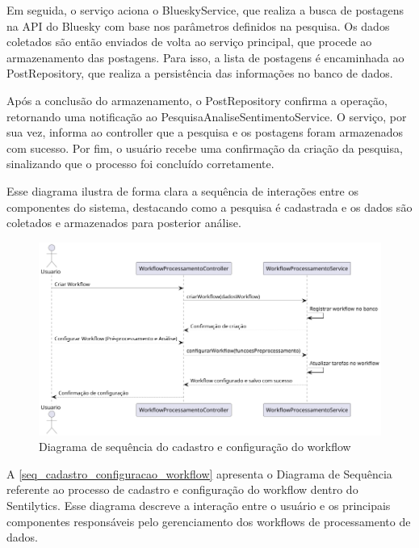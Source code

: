 \documentclass[
	12pt,				%
	oneside,			%
	a4paper,			%
	english,			%
	french,				%
	spanish,			%
	brazil				%
	]{abntex2}
\begin{document}
Em seguida, o serviço aciona o BlueskyService, que realiza a busca de
postagens na API do Bluesky com base nos parâmetros definidos na
pesquisa. Os dados coletados são então enviados de volta ao serviço
principal, que procede ao armazenamento das postagens. Para isso, a
lista de postagens é encaminhada ao PostRepository, que realiza a
persistência das informações no banco de dados.

Após a conclusão do armazenamento, o PostRepository confirma a operação,
retornando uma notificação ao PesquisaAnaliseSentimentoService. O
serviço, por sua vez, informa ao controller que a pesquisa e os
postagens foram armazenados com sucesso. Por fim, o usuário recebe uma
confirmação da criação da pesquisa, sinalizando que o processo foi
concluído corretamente.

Esse diagrama ilustra de forma clara a sequência de interações entre os
componentes do sistema, destacando como a pesquisa é cadastrada e os
dados são coletados e armazenados para posterior análise.

\begin{figure}[htbp]
\hypertarget{seq_cadastro_configuracao_workflow}{%
\caption{Diagrama de sequência do cadastro e configuração do workflow}\label{seq_cadastro_configuracao_workflow}
\begin{center}
\includegraphics[scale=0.4]{imagens/sentilytics/diagramas/sequencia-cadastro-configuracao-workflow.png}
\end{center}
}
\end{figure}

A \autoref{seq_cadastro_configuracao_workflow} apresenta o Diagrama de
Sequência referente ao processo de cadastro e configuração do workflow
dentro do Sentilytics. Esse diagrama descreve a interação entre o
usuário e os principais componentes responsáveis pelo gerenciamento dos
workflows de processamento de dados.
\end{document}
